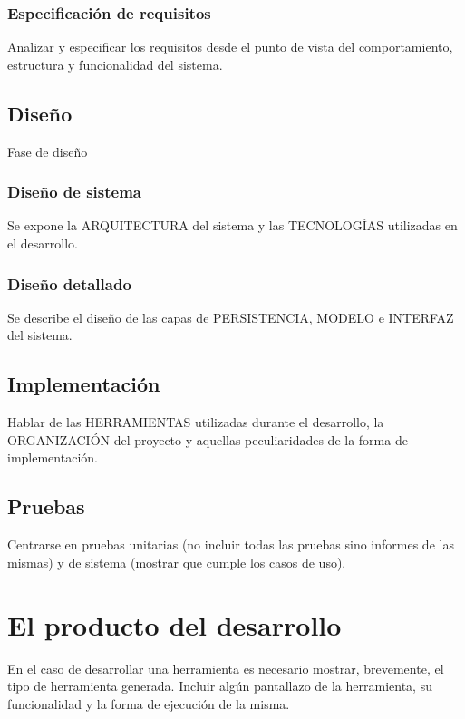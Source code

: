 \documentclass[12pt,a4paper,onecolumn,oneside]{report}
\begin{document}
\subsubsection{Especificación de requisitos}

Analizar y especificar los requisitos desde el punto de vista del comportamiento, estructura y funcionalidad del sistema.


\subsection{Diseño}

Fase de diseño

\subsubsection{Diseño de sistema}

Se expone la ARQUITECTURA del sistema y las TECNOLOGÍAS utilizadas en el desarrollo.

\subsubsection{Diseño detallado}

Se describe el diseño de las capas de PERSISTENCIA, MODELO e INTERFAZ del sistema.


\subsection{Implementación}

Hablar de las HERRAMIENTAS utilizadas durante el desarrollo, la ORGANIZACIÓN del proyecto y aquellas peculiaridades de la forma de implementación.

\subsection{Pruebas}

Centrarse en pruebas unitarias (no incluir todas las pruebas sino informes de las mismas) y de sistema (mostrar que cumple los casos de uso).


\section{El producto del desarrollo}

En el caso de desarrollar una herramienta es necesario mostrar, brevemente, el tipo de herramienta generada. Incluir algún pantallazo de la herramienta, su funcionalidad y la forma de ejecución de la misma.
\end{document}
